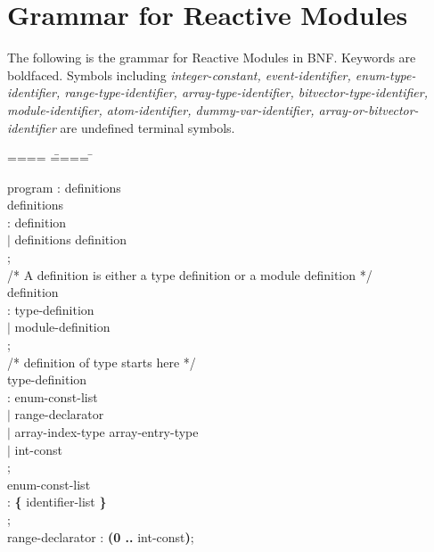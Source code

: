\section{Grammar for Reactive Modules}
The following is the grammar for Reactive Modules in BNF. Keywords are 
boldfaced. Symbols including {\it 
integer-constant, 
event-identifier,
enum-type-identifier, 
range-type-identifier,
array-type-identifier,
bitvector-type-identifier,
module-identifier,
atom-identifier,
dummy-var-identifier,
array-or-bitvector-identifier
} are undefined terminal symbols.

\begin{tab}
\begin{tabbing}

==== \= ==== \= \kill

program : definitions \\

definitions  \\
\>: definition \\
\>$|$ definitions definition \\
\>; \\

/* A definition is either a type definition or a module definition */ \\

definition  \\
\> : type-definition \\
\> $|$ module-definition \\
\> ; \\

/* definition of type starts here */ \\
type-definition  \\
\>: \TYPEDEF \ENUMID \COLON enum-const-list \\
\>$|$ \TYPEDEF \RANGEID \COLON range-declarator \\
\>$|$ \TYPEDEF \ARRAYID \COLON \ARRAY array-index-type \OF array-entry-type \\
\>$|$ \TYPEDEF \BITVECID \COLON \BITVECTOR int-const \\
\>; \\

enum-const-list  \\
\>: {\bf \{} identifier-list {\bf \}} \\
\>; \\

range-declarator : {\bf (0 ..}  int-const{\bf )}; \\


\end{tabbing}
\end{tab}

